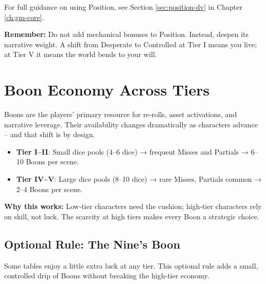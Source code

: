 For full guidance on using Position, see Section \ref{sec:position-dv} in Chapter \ref{ch:gm-core}. 

\textbf{Remember:} Do not add mechanical bonuses to Position. Instead, deepen its narrative weight. A shift from Desperate to Controlled at Tier I means you live; at Tier V it means the world bends to your will.

\section{Boon Economy Across Tiers}
\label{sec:boon-economy-tiers}

Boons are the players’ primary resource for re‑rolls, asset activations, and narrative leverage. Their availability changes dramatically as characters advance – and that shift is by design.

\begin{itemize}
  \item \textbf{Tier I–II}: Small dice pools (4–6 dice) → frequent Misses and Partials → 6–10 Boons per scene.
  \item \textbf{Tier IV–V}: Large dice pools (8–10 dice) → rare Misses, Partials common → 2–4 Boons per scene.
\end{itemize}

\textbf{Why this works:} Low‑tier characters need the cushion; high‑tier characters rely on skill, not luck. The scarcity at high tiers makes every Boon a strategic choice.

\subsection{Optional Rule: The Nine’s Boon}
\label{subsec:nines-boon}

Some tables enjoy a little extra luck at any tier. This optional rule adds a small, controlled drip of Boons without breaking the high‑tier economy.

